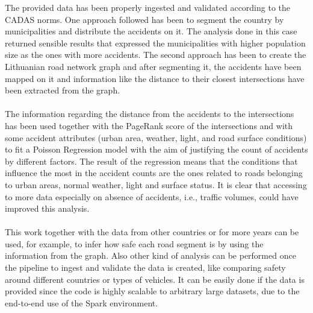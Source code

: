 The provided data has been properly ingested and validated according to the \ac{CADAS} norms. One approach followed has been to segment the country by municipalities and distribute the accidents on it. The analysis done in this case returned sensible results that expressed the municipalities with higher population size as the ones with more accidents. The second approach has been to create the Lithuanian road network graph and after segmenting it, the accidents have been mapped on it and information like the distance to their closest intersections have been extracted from the graph. \\
\\
The information regarding the distance from the accidents to the intersections has been used together with the PageRank score of the intersections and with some accident attributes (urban area, weather, light, and road surface conditions) to fit a Poisson Regression model with the aim of justifying the count of accidents by different factors. The result of the regression means that the conditions that influence the most in the accident counts are the ones related to roads belonging to urban areas, normal weather, light and surface status. It is clear that accessing to more data especially on absence of accidents, i.e., traffic volumes, could have improved this analysis. 
\\
\\
This work together with the data from other countries or for more years can be used, for example, to infer how safe each road segment is by using the information from the graph. Also other kind of analysis can be performed once the pipeline to ingest and validate the data is created, like comparing safety around different countries or types of vehicles. It can be easily done if the data is provided since the code is highly scalable to arbitrary large datasets, due to the end-to-end use of the Spark environment. 
